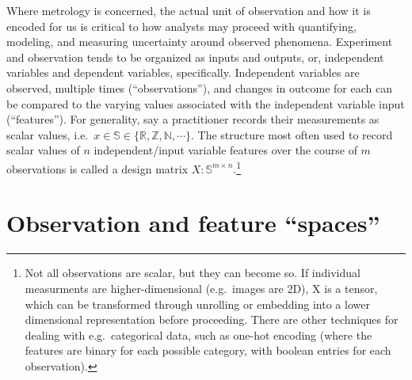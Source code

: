 \documentclass[%
	12pt,
		oneside,
		letterpaper
]{book}
\begin{document}
Where metrology is concerned, the actual unit of observation and how it
is encoded for us is critical to how analysts may proceed with
quantifying, modeling, and measuring uncertainty around observed
phenomena. Experiment and observation tends to be organized as inputs
and outputs, or, independent variables and dependent variables,
specifically. Independent variables are observed, multiple times
(``observations''), and changes in outcome for each can be compared to
the varying values associated with the independent variable input
(``features''). For generality, say a practitioner records their
measurements as scalar values,
i.e.~\(x\in\mathbb{S}\in\{\mathbb{R,Z,N},\cdots\}\). The structure most
often used to record scalar values of \(n\) independent/input variable
features over the course of \(m\) observations is called a design matrix
\(X:\mathbb{S}^{m\times n}\).\footnote{ Not all observations are scalar,
  but they can become so. If individual measurments are
  higher-dimensional (e.g.~images are 2D), X is a tensor, which can be
  transformed through unrolling or embedding into a lower dimensional
  representation before proceeding. There are other techniques for
  dealing with e.g.~categorical data, such as one-hot encoding (where
  the features are binary for each possible category, with boolean
  entries for each observation).}

\section{Observation and feature
``spaces''}\label{observation-and-feature-spaces}
\end{document}
